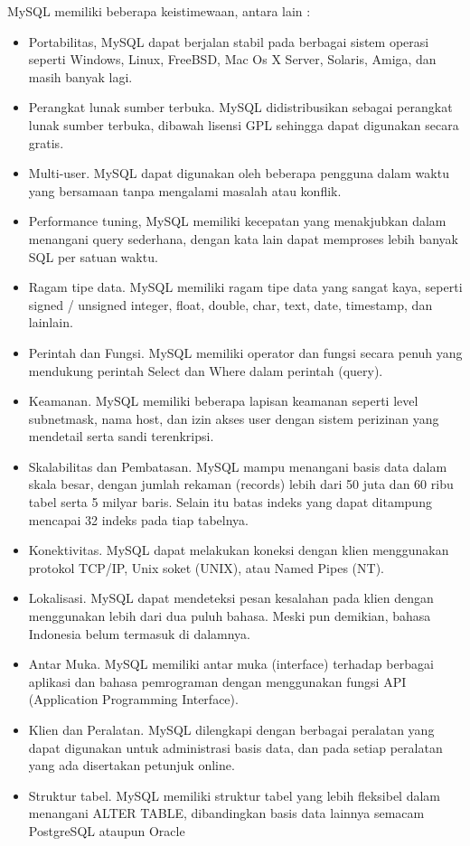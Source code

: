 MySQL memiliki beberapa keistimewaan, antara lain : 
\begin{itemize}
\item Portabilitas, MySQL dapat berjalan stabil pada berbagai sistem operasi seperti Windows, Linux, FreeBSD, Mac Os X Server, Solaris, Amiga, dan masih banyak lagi. 
\item Perangkat lunak sumber terbuka. MySQL didistribusikan sebagai perangkat lunak sumber terbuka, dibawah lisensi GPL sehingga dapat digunakan secara gratis.
\item Multi-user. MySQL dapat digunakan oleh beberapa pengguna dalam waktu yang bersamaan tanpa mengalami masalah atau konflik.
\item Performance tuning, MySQL memiliki kecepatan yang menakjubkan dalam menangani query sederhana, dengan kata lain dapat memproses lebih banyak SQL per satuan waktu. 
\item Ragam tipe data. MySQL memiliki ragam tipe data yang sangat kaya, seperti signed / unsigned integer, float, double, char, text, date, timestamp, dan lainlain.
\item Perintah dan Fungsi. MySQL memiliki operator dan fungsi secara penuh yang mendukung perintah Select dan Where dalam perintah (query).
\item Keamanan. MySQL memiliki beberapa lapisan keamanan seperti level subnetmask, nama host, dan izin akses user dengan sistem perizinan yang mendetail serta sandi terenkripsi. 
\item Skalabilitas dan Pembatasan. MySQL mampu menangani basis data dalam skala besar, dengan jumlah rekaman (records) lebih dari 50 juta dan 60 ribu tabel serta 5 milyar baris. Selain itu batas indeks yang dapat ditampung mencapai 32 indeks pada tiap tabelnya.
\item Konektivitas. MySQL dapat melakukan koneksi dengan klien menggunakan protokol TCP/IP, Unix soket (UNIX), atau Named Pipes (NT).
\item Lokalisasi. MySQL dapat mendeteksi pesan kesalahan pada klien dengan menggunakan lebih dari dua puluh bahasa. Meski pun demikian, bahasa Indonesia belum termasuk di dalamnya. 
\item Antar Muka. MySQL memiliki antar muka (interface) terhadap berbagai aplikasi dan bahasa pemrograman dengan menggunakan fungsi API (Application Programming Interface).
\item Klien dan Peralatan. MySQL dilengkapi dengan berbagai peralatan yang dapat digunakan untuk administrasi basis data, dan pada setiap peralatan yang ada disertakan petunjuk online.\
\item Struktur tabel. MySQL memiliki struktur tabel yang lebih fleksibel dalam menangani ALTER TABLE, dibandingkan basis data lainnya semacam PostgreSQL ataupun Oracle

\end{itemize}

